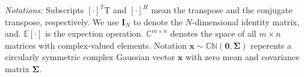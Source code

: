 \documentclass[12pt,journal,draftclsnofoot,onecolumn]{IEEEtran}
\begin{document}


\emph{Notations:} Subscripts $[\cdot]^T$T and $[\cdot]^H$ mean the transpose and
the conjugate transpose, respectively. We use $\mathbf{I}_{N}$  to denote the
$N$-dimensional identity matrix, and. $\mathbb{E}[\cdot]$ is the expection operation. $\mathbb{C}^{m \times n}$ denotes the space of all $m \times n$ matrices
with complex-valued elements. Notation $\mathbf{x} \sim \mathbb{CN}(\mathbf{0},\mathbf{\Sigma})$ reperents a
circularly symmetric complex Gaussian vector $\mathbf{x}$  with
zero mean and covariance matrix $\mathbf{\Sigma}$.
\end{document}
